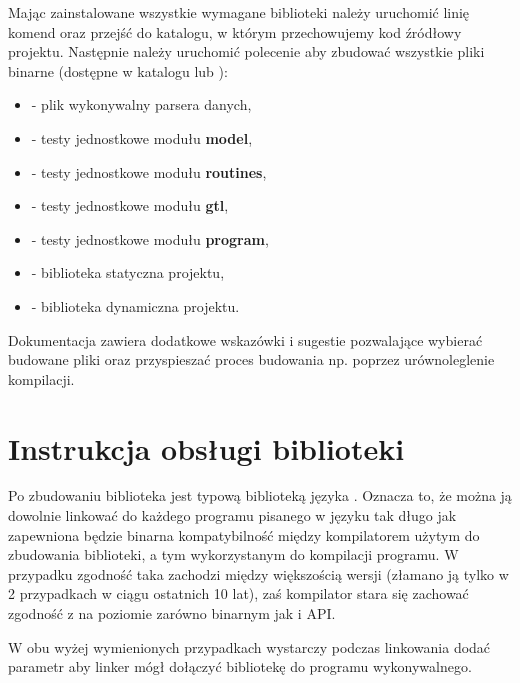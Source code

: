 \documentclass[polish]{standalone}
\begin{document}
Mając zainstalowane wszystkie wymagane biblioteki należy uruchomić linię komend oraz przejść do katalogu, w którym
przechowujemy kod źródłowy projektu. Następnie należy uruchomić polecenie  aby zbudować wszystkie pliki
binarne (dostępne w katalogu  lub ):
\begin{itemize}
\item {} - plik wykonywalny parsera danych,
\item {} - testy jednostkowe modułu \textbf{model},
\item {} - testy jednostkowe modułu \textbf{routines},
\item {} - testy jednostkowe modułu \textbf{gtl},
\item {} - testy jednostkowe modułu \textbf{program},
\item {} - biblioteka statyczna projektu,
\item {} - biblioteka dynamiczna projektu.
\end{itemize}
Dokumentacja zawiera dodatkowe wskazówki i sugestie pozwalające wybierać budowane pliki oraz przyspieszać proces 
budowania np. poprzez urównoleglenie kompilacji.

\chapter{Instrukcja obsługi biblioteki}

Po zbudowaniu biblioteka jest typową biblioteką języka . Oznacza to, że można ją dowolnie linkować do każdego
programu pisanego w języku  tak długo jak zapewniona będzie binarna kompatybilność między kompilatorem użytym
do zbudowania biblioteki, a tym wykorzystanym do kompilacji programu. W przypadku  zgodność taka zachodzi
między większością wersji (złamano ją tylko w 2 przypadkach w ciągu ostatnich 10 lat), zaś kompilator  stara
się zachować zgodność z  na poziomie zarówno binarnym jak i API.

W obu wyżej wymienionych przypadkach wystarczy podczas linkowania dodać parametr 
aby linker mógł dołączyć bibliotekę do programu wykonywalnego.
\end{document}
